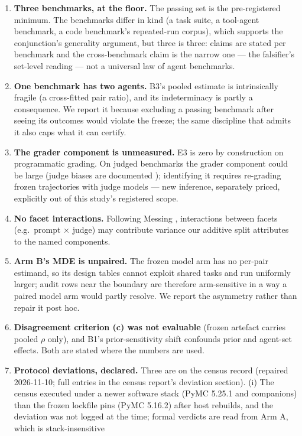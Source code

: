 \documentclass[11pt]{article}
\begin{document}
\begin{enumerate}
\item \textbf{Three benchmarks, at the floor.} The passing set is the
pre-registered minimum. The benchmarks differ in kind (a task suite, a
tool-agent benchmark, a code benchmark's repeated-run corpus), which
supports the conjunction's generality argument, but three is three:
claims are stated per benchmark and the cross-benchmark claim is the
narrow one --- the falsifier's set-level reading --- not a universal
law of agent benchmarks.
\item \textbf{One benchmark has two agents.} B3's pooled estimate is
intrinsically fragile (a cross-fitted pair ratio), and its
indeterminacy is partly a consequence. We report it because excluding
a passing benchmark after seeing its outcomes would violate the
freeze; the same discipline that admits it also caps what it can
certify.
\item \textbf{The grader component is unmeasured.} E3 is zero by
construction on programmatic grading. On judged benchmarks the grader
component could be large (judge biases are documented
\cite{zheng2023}); identifying it requires re-grading frozen
trajectories with judge models --- new inference, separately priced,
explicitly out of this study's registered scope.
\item \textbf{No facet interactions.} Following Messing
\cite{messing2026}, interactions between facets (e.g.\ prompt
$\times$ judge) may contribute variance our additive split attributes
to the named components.
\item \textbf{Arm B's MDE is unpaired.} The frozen model arm has no
per-pair estimand, so its design tables cannot exploit shared tasks
and run uniformly larger; audit rows near the boundary are therefore
arm-sensitive in a way a paired model arm would partly resolve. We
report the asymmetry rather than repair it post hoc.
\item \textbf{Disagreement criterion (c) was not evaluable} (frozen
artefact carries pooled $\rho$ only), and B1's prior-sensitivity shift
confounds prior and agent-set effects. Both are stated where the
numbers are used.
\item \textbf{Protocol deviations, declared.} Three are on the census
record (repaired 2026-11-10; full entries in the census report's
deviation section). (i) The census executed under a newer software
stack (PyMC 5.25.1 and companions) than the frozen lockfile pins (PyMC
5.16.2) after host rebuilds, and the deviation was not logged at the
time; formal verdicts are read from Arm A, which is stack-insensitive

\end{enumerate}
\end{document}
